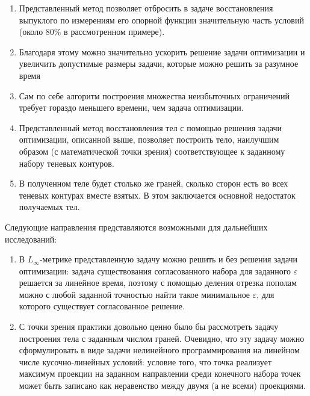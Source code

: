 \documentclass[a4paper, 10pt]{article}
\theoremstyle{definition}
\theoremstyle{plain}
\theoremstyle{plain}
\begin{document}
\begin{enumerate}
 \item Представленный метод позволяет отбросить в задаче восстановления
 выпуклого по измерениям его опорной функции значительную часть условий
 (около 80\% в рассмотренном примере).
 \item Благодаря этому можно значительно ускорить решение задачи оптимизации и
 увеличить допустимые размеры задачи, которые можно решить за разумное время
 \item Сам по себе алгоритм построения множества неизбыточных ограничений
 требует гораздо меньшего времени, чем задача оптимизации.
 \item Представленный метод восстановления тел с помощью решения задачи
 оптимизации, описанной выше, позволяет построить тело, наилучшим образом
 (с математической точки зрения) соответствующее к заданному набору теневых
 контуров.
 \item В полученном теле будет столько же граней, сколько сторон есть во всех
 теневых контурах вместе взятых. В этом заключается основной недостаток
 получаемых тел.
\end{enumerate}

Следующие направления представляются возможными для дальнейших исследований:

\begin{enumerate}
 \item В $L_{\infty}$-метрике представленную задачу можно решить и без
 решения задачи оптимизации: задача существования согласованного набора для
 заданного $\varepsilon$ решается за линейное время, поэтому с помощью деления
 отрезка пополам можно с любой заданной точностью найти такое минимальное
 $\varepsilon$, для которого существует согласованное решение.
 \item С точки зрения практики довольно ценно было бы рассмотреть задачу
 построения тела с заданным числом граней. Очевидно, что эту задачу можно
 сформулировать в виде задачи нелинейного программирования на линейном числе
 кусочно-линейных условий: условие того, что точка реализует максимум проекции
 на заданном направлении среди конечного набора точек может быть записано как
 неравенство между двумя (а не всеми) проекциями.
\end{enumerate}
\end{document}
